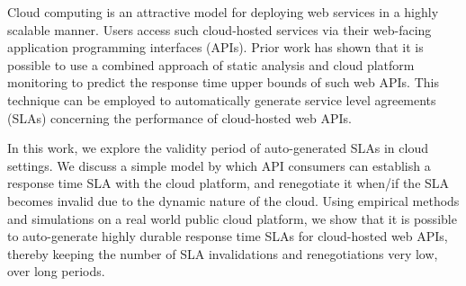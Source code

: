 Cloud computing is an attractive model for deploying web services in
a highly scalable manner. Users access such
cloud-hosted services via their web-facing application programming
interfaces (APIs). Prior work has shown that it is possible to use a combined
approach of static analysis and cloud platform monitoring to predict the response
time upper bounds of such web APIs. This technique can be employed to
automatically generate service level agreements (SLAs) concerning the
performance of cloud-hosted web APIs.

In this work, we explore the validity period of auto-generated SLAs in
cloud settings. We discuss a simple model by which API consumers
can establish a response time SLA with the cloud platform, and renegotiate it when/if 
the SLA becomes invalid due to the dynamic nature of the cloud.
Using empirical methods and simulations on a real world
public cloud platform, we show that it is possible to auto-generate
highly durable response time SLAs for cloud-hosted web APIs, thereby
keeping the number of SLA invalidations and renegotiations very low, over
long periods.
